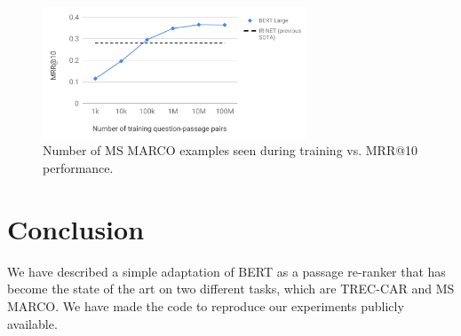 \documentclass{article} %
\begin{document}
\begin{figure}
\begin{center}
\centerline{\includegraphics[width=0.7\textwidth]{chart}}
\vspace{-4mm}
\caption{Number of MS MARCO examples seen during training vs. MRR@10 performance.} 
\label{fig:training_size}
\end{center}
\vspace{-6mm}
\end{figure}

\section{Conclusion}

We have described a simple adaptation of BERT as a passage re-ranker that has become the state of the art on two different tasks, which are TREC-CAR and MS MARCO. We have made the code to reproduce our experiments publicly available.



\end{document}
